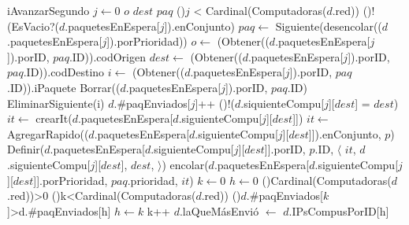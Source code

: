\begin{Algoritmos}
  \begin{algoritmo}{iAvanzarSegundo}{}{}
     $j \gets 0$
     $o$
     $dest$
     $paq$
    \While(){$j$ < Cardinal(Computadoras($d$.red))}{
      \If(){!(EsVacio?($d$.paquetesEnEspera[$j$]).enConjunto)}{
        $paq \gets$ Siguiente(desencolar(($d$.paquetesEnEspera[$j$]).porPrioridad))
        $o \gets$ (Obtener(($d$.paquetesEnEspera[$j$]).porID, $paq$.ID)).codOrigen
        $dest \gets$ (Obtener(($d$.paquetesEnEspera[$j$]).porID, $paq$.ID)).codDestino
        $i \gets$ (Obtener(($d$.paquetesEnEspera[$j$]).porID, $paq$.ID)).iPaquete
        Borrar(($d$.paquetesEnEspera[$j$]).porID, $paq$.ID)
        EliminarSiguiente(i)
        $d$.\#paqEnviados[$j$]++
        \If(){!($d$.siquienteCompu[$j$][$dest$] = $dest$)}{
          $it \gets$ crearIt($d$.paquetesEnEspera[$d$.siguienteCompu[$j$][$dest$]])
          $it \gets$ AgregarRapido(($d$.paquetesEnEspera[$d$.siguienteCompu[$j$][$dest$]]).enConjunto, $p$)
          Definir($d$.paquetesEnEspera[$d$.siguienteCompu[$j$][$dest$]].porID, $p$.ID, $\langle$ $it$, $d$.siguienteCompu[$j$][$dest$], $dest$, $\rangle$)
          encolar($d$.paquetesEnEspera[$d$.siguienteCompu[$j$][$dest$]].porPrioridad, $paq$.prioridad, $it$)
        }
      }
    }
     $k \gets 0$
     $h \gets 0$
    \If(){Cardinal(Computadoras($d$.red))>0}{
      \While(){k<Cardinal(Computadoras($d$.red))}{
        \If(){$d$.\#paqEnviados[$k$]>d.\#paqEnviados[h]}{
          $h \gets k$
          k++
        }
      }
    }
    $d$.laQueM\'asEnvi\'o $\gets$ $d$.IPsCompusPorID[h]
  \end{algoritmo}
 \datosAlgoritmo{} %
  {} %
  {} %
  {} %
  {} %



\end{Algoritmos}
